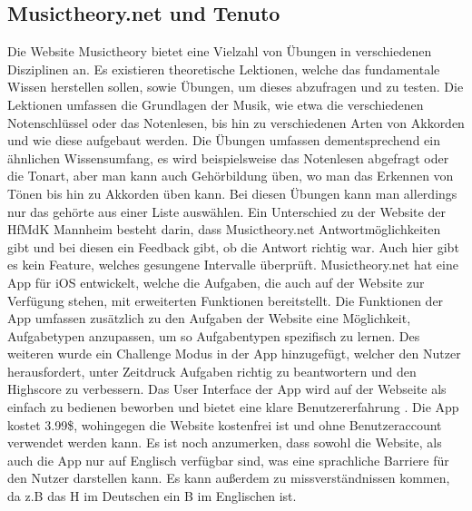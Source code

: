 \subsection*{Musictheory.net und Tenuto}
\label{sec:Musictheory.net} \label{sec:Tenuto}
Die Website Musictheory bietet eine Vielzahl von Übungen in verschiedenen Disziplinen an. Es existieren theoretische Lektionen, welche das fundamentale Wissen herstellen sollen, sowie Übungen, um dieses abzufragen und zu testen. 
Die Lektionen umfassen die Grundlagen der Musik, wie etwa die verschiedenen Notenschlüssel oder das Notenlesen, bis hin zu verschiedenen Arten von Akkorden und wie diese aufgebaut werden. Die Übungen umfassen dementsprechend ein ähnlichen Wissensumfang, es wird beispielsweise das Notenlesen abgefragt oder die Tonart, aber man kann auch Gehörbildung üben, wo man das Erkennen von Tönen bis hin zu Akkorden üben kann. Bei diesen Übungen kann man
allerdings nur das gehörte aus einer Liste auswählen. Ein Unterschied zu der Website der HfMdK Mannheim besteht darin, dass Musictheory.net Antwortmöglichkeiten gibt und bei diesen ein Feedback gibt, ob 
die Antwort richtig war. Auch hier gibt es kein Feature, welches gesungene Intervalle überprüft. Musictheory.net hat eine App für iOS entwickelt, welche die Aufgaben, die auch auf der Website zur Verfügung stehen,
mit erweiterten Funktionen bereitstellt. Die Funktionen der App umfassen zusätzlich zu den Aufgaben der Website eine Möglichkeit, Aufgabetypen anzupassen, um so Aufgabentypen spezifisch zu lernen. Des weiteren wurde ein Challenge Modus in der App hinzugefügt, welcher den Nutzer herausfordert, unter Zeitdruck Aufgaben richtig zu beantwortern und den Highscore zu verbessern. Das User Interface der App wird auf der Webseite als einfach zu bedienen beworben und bietet eine klare Benutzererfahrung . 
Die App kostet 3.99\$, wohingegen die Website kostenfrei ist und ohne Benutzeraccount verwendet werden kann. Es ist noch anzumerken, dass sowohl die Website, als auch die App nur auf Englisch verfügbar sind, was eine sprachliche Barriere für den Nutzer darstellen kann. Es kann außerdem zu missverständnissen kommen, da z.B das H im Deutschen ein B im Englischen ist. \cite{musictheory}

